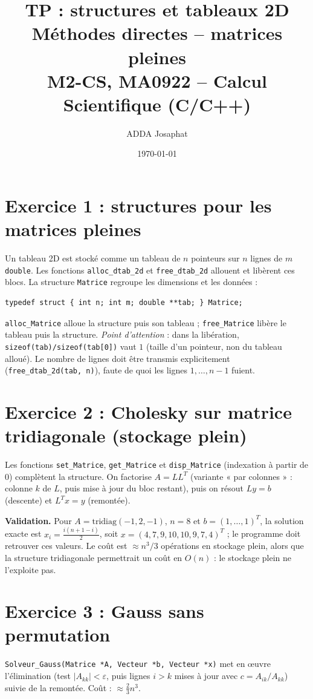 \documentclass[10pt,a4paper]{article}
\title{\vspace{-1.2cm}\textbf{TP : structures et tableaux 2D\\
Méthodes directes -- matrices pleines}\\[2pt]
\large M2-CS, MA0922 -- Calcul Scientifique (C/C++)}
\author{ADDA Josaphat}
\date{\today}
\begin{document}
\maketitle
\vspace{-0.8cm}

\section*{Exercice 1 : structures pour les matrices pleines}
Un tableau 2D est stocké comme un tableau de $n$ pointeurs sur $n$ lignes
de $m$ \texttt{double}. Les fonctions \texttt{alloc\_dtab\_2d} et
\texttt{free\_dtab\_2d} allouent et libèrent ces blocs. La structure
\texttt{Matrice} regroupe les dimensions et les données :
\begin{lstlisting}
typedef struct { int n; int m; double **tab; } Matrice;
\end{lstlisting}
\texttt{alloc\_Matrice} alloue la structure puis son tableau ;
\texttt{free\_Matrice} libère le tableau puis la structure.
\emph{Point d'attention} : dans la libération, \texttt{sizeof(tab)/sizeof(tab[0])}
vaut $1$ (taille d'un pointeur, non du tableau alloué). Le nombre de lignes
doit être transmis explicitement (\texttt{free\_dtab\_2d(tab, n)}), faute de quoi
les lignes $1,\dots,n-1$ fuient.

\section*{Exercice 2 : Cholesky sur matrice tridiagonale (stockage plein)}
Les fonctions \texttt{set\_Matrice}, \texttt{get\_Matrice} et
\texttt{disp\_Matrice} (indexation à partir de $0$) complètent la structure.
On factorise $A=LL^T$ (variante « par colonnes » : colonne $k$ de $L$, puis mise à
jour du bloc restant), puis on résout $Ly=b$ (descente) et $L^Tx=y$ (remontée).

\textbf{Validation.} Pour $A=\mathrm{tridiag}(-1,2,-1)$, $n=8$ et $b=(1,\dots,1)^T$,
la solution exacte est $x_i=\tfrac{i(n+1-i)}{2}$, soit
$x=(4,7,9,10,10,9,7,4)^T$ ; le programme doit retrouver ces valeurs.
Le coût est $\approx n^3/3$ opérations en stockage plein, alors que la structure
tridiagonale permettrait un coût en $O(n)$ : le stockage plein ne l'exploite pas.

\section*{Exercice 3 : Gauss sans permutation}
\texttt{Solveur\_Gauss(Matrice *A, Vecteur *b, Vecteur *x)} met en œuvre
l'élimination (test $|A_{kk}|<\varepsilon$, puis lignes $i>k$ mises à jour avec
$c=A_{ik}/A_{kk}$) suivie de la remontée. Coût : $\approx\tfrac23 n^3$.
\end{document}
